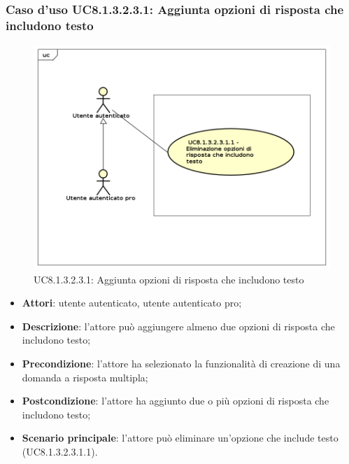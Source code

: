 \subsubsection{Caso d'uso UC8.1.3.2.3.1: Aggiunta opzioni di risposta che includono testo}
	\label{UC8.1.3.2.3.1}
	\begin{figure}[h]
		\centering
			\includegraphics[scale=0.45,keepaspectratio]{UML/UC8_1_3_2_3_1.png}
		\caption{UC8.1.3.2.3.1: Aggiunta opzioni di risposta che includono testo}
	\end{figure}	
	\FloatBarrier
	\begin{itemize}
		\item
			\textbf{Attori}: utente autenticato, utente autenticato pro;
		\item		
			\textbf{Descrizione}: l'attore può aggiungere almeno due opzioni di risposta che includono testo;
		\item
			\textbf{Precondizione}: l'attore ha selezionato la funzionalità di creazione di una domanda a risposta multipla;
		\item
			\textbf{Postcondizione}: l'attore ha aggiunto due o più opzioni di risposta che includono testo;
		\item
			\textbf{Scenario principale}: l'attore può eliminare un'opzione che include testo (UC8.1.3.2.3.1.1).				
	\end{itemize}	
	
